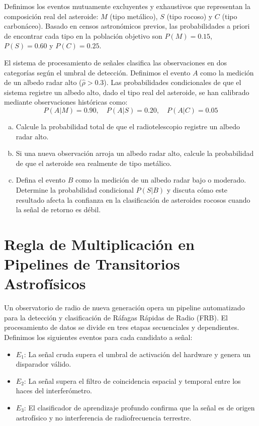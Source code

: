 \documentclass[a4paper]{article}
\begin{document}
Definimos los eventos mutuamente excluyentes y exhaustivos que representan la composición real del asteroide: $M$ (tipo metálico), $S$ (tipo rocoso) y $C$ (tipo carbonáceo). Basado en censos astronómicos previos, las probabilidades a priori de encontrar cada tipo en la población objetivo son $P(M) = 0.15$, $P(S) = 0.60$ y $P(C) = 0.25$.

El sistema de procesamiento de señales clasifica las observaciones en dos categorías según el umbral de detección. Definimos el evento $A$ como la medición de un albedo radar alto ($\hat{\rho} > 0.3$). Las probabilidades condicionales de que el sistema registre un albedo alto, dado el tipo real del asteroide, se han calibrado mediante observaciones históricas como:
$$
P(A|M) = 0.90, \quad P(A|S) = 0.20, \quad P(A|C) = 0.05
$$

\begin{enumerate}[a)]
\item Calcule la probabilidad total de que el radiotelescopio registre un albedo radar alto.
\item Si una nueva observación arroja un albedo radar alto, calcule la probabilidad de que el asteroide sea realmente de tipo metálico. 
\item Defina el evento $B$ como la medición de un albedo radar bajo o moderado. Determine la probabilidad condicional $P(S|B)$ y discuta cómo este resultado afecta la confianza en la clasificación de asteroides rocosos cuando la señal de retorno es débil.
\end{enumerate}

\section{Regla de Multiplicación en Pipelines de Transitorios Astrofísicos}
\label{sec:problema-14}

Un observatorio de radio de nueva generación opera un pipeline automatizado para la detección y clasificación de Ráfagas Rápidas de Radio (FRB). El procesamiento de datos se divide en tres etapas secuenciales y dependientes. Definimos los siguientes eventos para cada candidato a señal:

\begin{itemize}
\item $E_1$: La señal cruda supera el umbral de activación del hardware y genera un disparador válido.
\item $E_2$: La señal supera el filtro de coincidencia espacial y temporal entre los haces del interferómetro.
\item $E_3$: El clasificador de aprendizaje profundo confirma que la señal es de origen astrofísico y no interferencia de radiofrecuencia terrestre.
\end{itemize}
\end{document}
